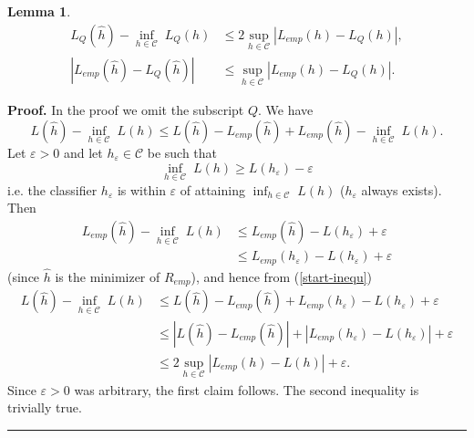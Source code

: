 \documentclass[11pt,twoside]{article}%
\theoremstyle{change}
\newtheorem{lemma}[theorem]{Lemma}
\newenvironment{proof}[1][Proof]{\textbf{#1.} }{\ \rule{0.5em}{0.5em}}
\begin{document}
\begin{lemma}
\label{lem-VC-basic}
\begin{align}
L_{Q}(\hat{h})-\inf_{h\in\mathcal{C}}\;L_{Q}(h)  & \leq2\sup_{h\in\mathcal{C}%
}\left\vert L_{emp}(h)-L_{Q}(h)\right\vert ,\label{basic-vc-1}\\
\left\vert L_{emp}(\hat{h})-L_{Q}(\hat{h})\right\vert  & \leq\sup
_{h\in\mathcal{C}}\left\vert L_{emp}(h)-L_{Q}(h)\right\vert
.\label{basic-vc-2}%
\end{align}

\end{lemma}

\begin{proof}
In the proof we omit the subscript $Q.$ We have
\begin{equation}
L(\hat{h})-\inf_{h\in\mathcal{C}}\;L(h)\leq L(\hat{h})-L_{emp}(\hat
{h})+L_{emp}(\hat{h})-\inf_{h\in\mathcal{C}}\;L(h).\label{start-inequ}%
\end{equation}
Let $\varepsilon>0$ and let $h_{\varepsilon}\in\mathcal{C}$ be such that
\[
\inf_{h\in\mathcal{C}}\;L(h)\geq L(h_{\varepsilon})-\varepsilon
\]
i.e. the classifier $h_{\varepsilon}$ is within $\varepsilon$ of attaining
$\inf_{h\in\mathcal{C}}\;L(h)$ ($h_{\varepsilon}$ always exists). Then
\begin{align*}
L_{emp}(\hat{h})-\inf_{h\in\mathcal{C}}\;L(h)  & \leq L_{emp}(\hat
{h})-L(h_{\varepsilon})+\varepsilon\\
& \leq L_{emp}(h_{\varepsilon})-L(h_{\varepsilon})+\varepsilon
\end{align*}
(since $\hat{h}$ is the minimizer of $R_{emp}$), and hence from
(\ref{start-inequ})%
\begin{align*}
L(\hat{h})-\inf_{h\in\mathcal{C}}\;L(h)  & \leq L(\hat{h})-L_{emp}(\hat
{h})+L_{emp}(h_{\varepsilon})-L(h_{\varepsilon})+\varepsilon\\
& \leq\left\vert L(\hat{h})-L_{emp}(\hat{h})\right\vert +\left\vert
L_{emp}(h_{\varepsilon})-L(h_{\varepsilon})\right\vert +\varepsilon\\
& \leq2\sup_{h\in\mathcal{C}}\left\vert L_{emp}(h)-L(h)\right\vert
+\varepsilon.
\end{align*}
Since $\varepsilon>0$ was arbitrary, the first claim follows. The second
inequality is trivially true.
\end{proof}
\end{document}
